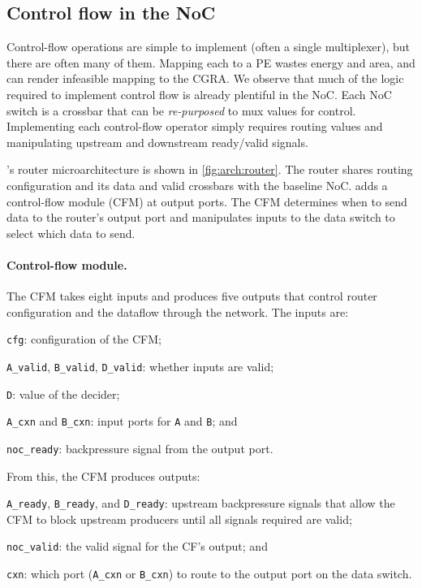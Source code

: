 \subsection{Control flow in the NoC}
\label{riptide:fin}

Control-flow operations are simple to implement (often a single
multiplexer), but there are often many of them.
%
Mapping each to a PE wastes energy and area, and can render infeasible mapping
to the CGRA.
%
We observe that much of the logic required to implement control flow is already
plentiful in the NoC.
%
Each NoC switch is a crossbar that can be {\em re-purposed} to mux values for
control.
%
Implementing each control-flow operator simply requires routing values and manipulating
upstream and downstream ready/valid signals.

\riptide's router microarchitecture is shown in \autoref{fig:arch:router}.
% 
The router shares routing configuration and its data and valid crossbars with
the baseline NoC.
%
\riptide adds a control-flow module (CFM) at output ports.
% 
The CFM determines when to send data to the router's output port and
manipulates inputs to the data switch to select which data to send.

\paragraph{Control-flow module.}
%
The CFM takes eight inputs and produces five outputs that control router
configuration and the dataflow through the network.
% 
The inputs are:
\begin{compactitem}

\item {\tt cfg}: configuration of the CFM;

\item {\tt A\_valid}, {\tt B\_valid}, {\tt D\_valid}: whether inputs are valid;

\item {\tt D}: value of the decider;

\item {\tt A\_cxn} and {\tt B\_cxn}: input ports for {\tt A} and {\tt B}; and

\item {\tt noc\_ready}: backpressure signal from the output port.
  
\end{compactitem}
%
From this, the CFM produces outputs:
\begin{compactitem}
  
\item {\tt A\_ready}, {\tt B\_ready}, and {\tt D\_ready}: upstream
  backpressure signals that allow the CFM to block upstream
  producers until all signals required are valid;

\item {\tt noc\_valid}: the valid signal for the CF's output; and

\item {\tt cxn}: which port ({\tt A\_cxn} or {\tt B\_cxn}) to route
  to the output port on the data switch.
  
\end{compactitem}

